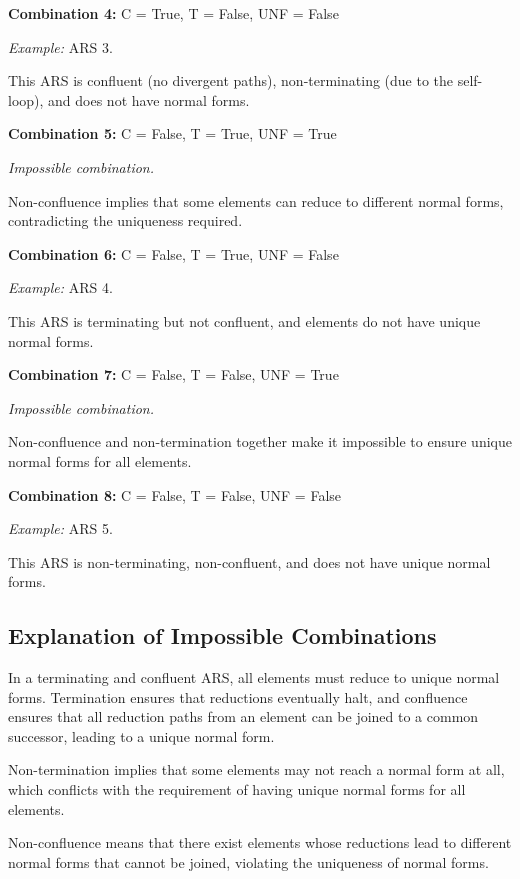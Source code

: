 \documentclass{article}
\theoremstyle{theorem}
\theoremstyle{definition}
\theoremstyle{remark}
\begin{document}
\textbf{Combination 4:} C = True, T = False, UNF = False

\emph{Example:} ARS 3.

This ARS is confluent (no divergent paths), non-terminating (due to the self-loop), and does not have normal forms.

\bigskip

\textbf{Combination 5:} C = False, T = True, UNF = True

\emph{Impossible combination.}

Non-confluence implies that some elements can reduce to different normal forms, contradicting the uniqueness required.

\bigskip

\textbf{Combination 6:} C = False, T = True, UNF = False

\emph{Example:} ARS 4.

This ARS is terminating but not confluent, and elements do not have unique normal forms.

\bigskip

\textbf{Combination 7:} C = False, T = False, UNF = True

\emph{Impossible combination.}

Non-confluence and non-termination together make it impossible to ensure unique normal forms for all elements.

\bigskip

\textbf{Combination 8:} C = False, T = False, UNF = False

\emph{Example:} ARS 5.

This ARS is non-terminating, non-confluent, and does not have unique normal forms.

\subsection*{Explanation of Impossible Combinations}

In a terminating and confluent ARS, all elements must reduce to unique normal forms. Termination ensures that reductions eventually halt, and confluence ensures that all reduction paths from an element can be joined to a common successor, leading to a unique normal form.

Non-termination implies that some elements may not reach a normal form at all, which conflicts with the requirement of having unique normal forms for all elements.

Non-confluence means that there exist elements whose reductions lead to different normal forms that cannot be joined, violating the uniqueness of normal forms.
\end{document}

